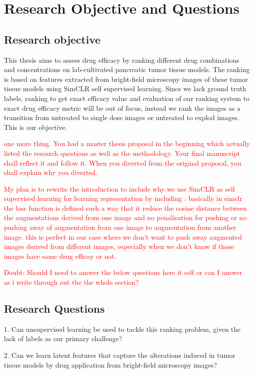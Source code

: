 \chapter{Research Objective and Questions}\label{ch:Research Objectives and Questions}
\section*{Research objective}
This thesis aims to assess drug efficacy by ranking different drug combinations and concentrations on lab-cultivated pancreatic tumor tissue models. 
The ranking is based on features extracted from bright-field microscopy images of these tumor tissue models using
SimCLR self supervised learning. Since we lack ground truth labels, ranking to get exact efficacy value and evaluation of our ranking system to exact drug efficacy metric 
 will be out of focus, instead we rank the images as a transition from untreated to single dose images or untreated to explod images. This is our objective.  


 \textcolor{red}{one more thing. You had a master thesis proposal in the beginning which actually listed the research questions as well as the methodology. 
 Your final manuscript shall reflect it and follow it. When you diverted from the original proposal, you shall explain why you diverted.} 


\textcolor{red}{My plan is to rewrite the introduction to include why we use SimCLR as self supervised learning for learning representation by including :
 basically in simclr the loss function is defined such a way that it reduce the cosine distance between the augmentations derived from one image  and no 
 penalisation for pushing or no pushing away of augmentation from one image to augmentation from another image. this is perfect in our case where 
 we don't want to push away augmented images derived from different images, especially when we don't know if those images have same drug efficay or not.}

\textcolor{red}{Doubt: Should I need to answer the below questions here it self or can I answer as i write through out the the whole section?}

\section*{Research Questions}
1. Can unsupervised learning be used to tackle this ranking problem, given the lack of labels as our primary challenge?

2. Can we learn latent features that capture the alterations induced in tumor tissue models by drug application from bright-field microscopy images?

